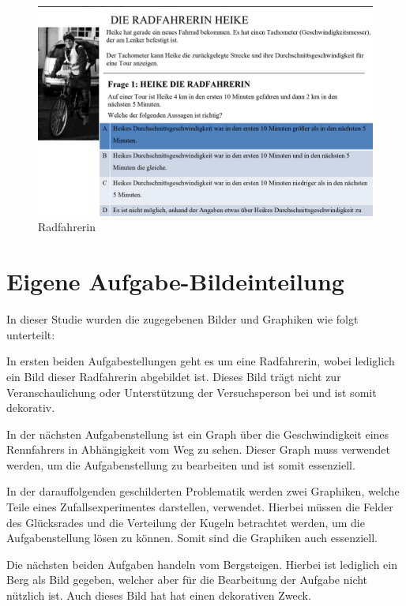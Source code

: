 \begin{figure}[H]
\noindent\hspace{0.5mm}\includegraphics[width=17cm]{./Ressourcen/Radfahrerin.png}
\caption{Radfahrerin}
\end{figure}

\section{Eigene Aufgabe-Bildeinteilung}

In dieser Studie wurden die zugegebenen Bilder und Graphiken wie folgt unterteilt:

In ersten beiden Aufgabestellungen geht es um eine Radfahrerin, wobei lediglich ein Bild dieser Radfahrerin abgebildet ist. Dieses Bild trägt nicht zur Veranschaulichung oder Unterstützung der Versuchsperson bei und ist somit dekorativ. 


In der nächsten Aufgabenstellung ist ein Graph über die Geschwindigkeit eines Rennfahrers in Abhängigkeit vom Weg zu sehen. Dieser Graph muss verwendet werden, um die Aufgabenstellung zu bearbeiten und ist somit essenziell. 


In der darauffolgenden geschilderten Problematik werden zwei Graphiken, welche Teile eines Zufallsexperimentes darstellen, verwendet. Hierbei müssen die Felder des Glücksrades und die Verteilung der Kugeln betrachtet werden, um die Aufgabenstellung lösen zu können. Somit sind die Graphiken auch essenziell.


Die nächsten beiden Aufgaben handeln vom Bergsteigen. Hierbei ist lediglich ein Berg als Bild gegeben, welcher aber für die Bearbeitung der Aufgabe nicht nützlich ist. Auch dieses Bild hat hat einen dekorativen Zweck.



